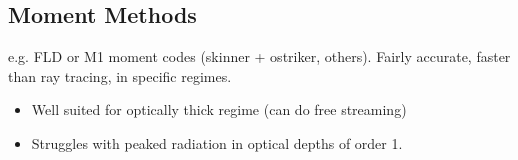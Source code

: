 \subsection{Moment Methods}
\label{sec:momentmethods}

e.g. FLD or M1 moment codes (skinner + ostriker, others). Fairly accurate, faster than ray tracing, in specific regimes.

\begin{itemize}
\item Well suited for optically thick regime (can do free streaming)
\item Struggles with peaked radiation in optical depths of order 1.
\end{itemize}


